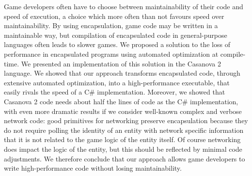 Game developers often have to choose between maintainability of their code and speed of execution, a choice which more often than not favours speed over maintainability. By using encapsulation, game code may be written in a maintainable way, but compilation of encapsulated code in general-purpose languages often leads to slower games. We proposed a solution to the loss of performance in encapsulated programs using automated optimization at compile-time. 
We presented an implementation of this solution in the Casanova 2 language. We showed that our approach transforms encapsulated code, through extensive automated optimization, into a high-performance executable, that easily rivals the speed of a C\# implementation. Moreover, we showed that Casanova 2 code needs about half the lines of code as the C\# implementation, with even more dramatic results if we consider well-known complex and verbose network code: good primitives for networking preserve encapsulation because they do not require polling the identity of an entity with network specific information that it is not related to the game logic of the entity itself. Of course networking does impact the logic of the entity, but this should be reflected by minimal code adjustments. We therefore conclude that our approach allows game developers to write high-performance code without losing maintainability.




